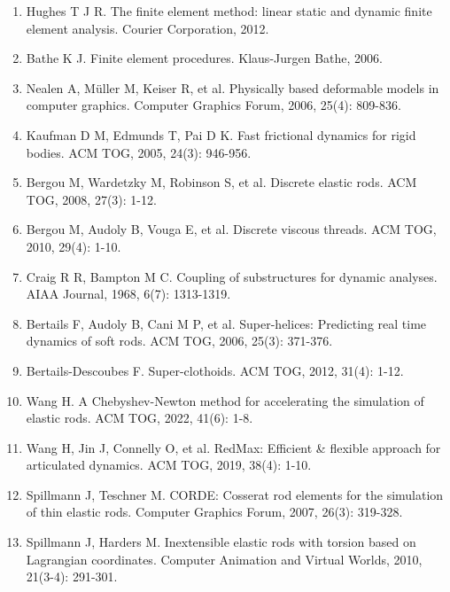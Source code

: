 
\begin{enumerate}
  \item Hughes T J R. The finite element method: linear static and dynamic finite element analysis. Courier Corporation, 2012.
  
  \item Bathe K J. Finite element procedures. Klaus-Jurgen Bathe, 2006.
  
  \item Nealen A, Müller M, Keiser R, et al. Physically based deformable models in computer graphics. Computer Graphics Forum, 2006, 25(4): 809-836.
  
  \item Kaufman D M, Edmunds T, Pai D K. Fast frictional dynamics for rigid bodies. ACM TOG, 2005, 24(3): 946-956.
  
  \item Bergou M, Wardetzky M, Robinson S, et al. Discrete elastic rods. ACM TOG, 2008, 27(3): 1-12.
  
  \item Bergou M, Audoly B, Vouga E, et al. Discrete viscous threads. ACM TOG, 2010, 29(4): 1-10.
  
  \item Craig R R, Bampton M C. Coupling of substructures for dynamic analyses. AIAA Journal, 1968, 6(7): 1313-1319.
  
  \item Bertails F, Audoly B, Cani M P, et al. Super-helices: Predicting real time dynamics of soft rods. ACM TOG, 2006, 25(3): 371-376.
  
  \item Bertails-Descoubes F. Super-clothoids. ACM TOG, 2012, 31(4): 1-12.
  
  \item Wang H. A Chebyshev-Newton method for accelerating the simulation of elastic rods. ACM TOG, 2022, 41(6): 1-8.
  
  \item Wang H, Jin J, Connelly O, et al. RedMax: Efficient \& flexible approach for articulated dynamics. ACM TOG, 2019, 38(4): 1-10.
  
  \item Spillmann J, Teschner M. CORDE: Cosserat rod elements for the simulation of thin elastic rods. Computer Graphics Forum, 2007, 26(3): 319-328.
  
  \item Spillmann J, Harders M. Inextensible elastic rods with torsion based on Lagrangian coordinates. Computer Animation and Virtual Worlds, 2010, 21(3-4): 291-301.
  

\end{enumerate}
